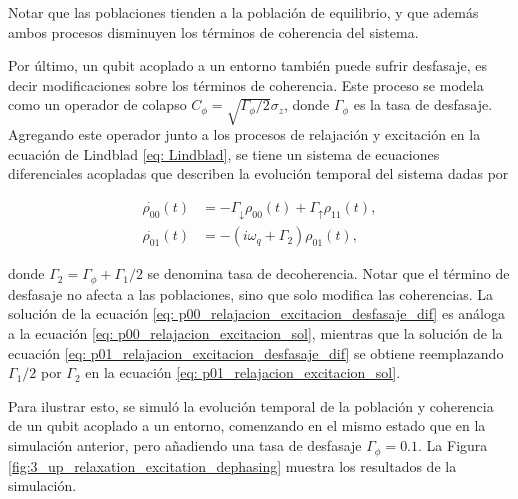 Notar que las poblaciones tienden a la población de equilibrio, y que además ambos procesos disminuyen los términos de coherencia del sistema.

Por último, un qubit acoplado a un entorno también puede sufrir desfasaje, es decir modificaciones sobre los términos de coherencia. Este proceso se modela como un operador de colapso \(C_\phi = \sqrt{\Gamma_\phi/2} \sigma_z\), donde \(\Gamma_\phi\) es la tasa de desfasaje. Agregando este operador junto a los procesos de relajación y excitación en la ecuación de Lindblad \ref{eq: Lindblad}, se tiene un sistema de ecuaciones diferenciales acopladas que describen la evolución temporal del sistema dadas por

\begin{align}
    \dot{\rho_{00}}(t) &= -\Gamma_\downarrow \rho_{00}(t) + \Gamma_\uparrow \rho_{11}(t), \label{eq: p00_relajacion_excitacion_desfasaje_dif} \\
    \dot{\rho_{01}}(t) &= -\left(i \omega_q + \Gamma_2 \right) \rho_{01}(t), \label{eq: p01_relajacion_excitacion_desfasaje_dif}
\end{align}

\noindent donde \(\Gamma_2 = \Gamma_\phi + \Gamma_1/2\) se denomina tasa de decoherencia. Notar que el término de desfasaje no afecta a las poblaciones, sino que solo modifica las coherencias. La solución de la ecuación \ref{eq: p00_relajacion_excitacion_desfasaje_dif} es análoga a la ecuación \ref{eq: p00_relajacion_excitacion_sol}, mientras que la solución de la ecuación \ref{eq: p01_relajacion_excitacion_desfasaje_dif} se obtiene reemplazando \(\Gamma_1/2\) por \(\Gamma_2\) en la ecuación \ref{eq: p01_relajacion_excitacion_sol}.

Para ilustrar esto, se simuló la evolución temporal de la población y coherencia de un qubit acoplado a un entorno, comenzando en el mismo estado que en la simulación anterior, pero añadiendo una tasa de desfasaje \(\Gamma_\phi = 0.1\). La Figura \ref{fig:3_up_relaxation_excitation_dephasing} muestra los resultados de la simulación.


